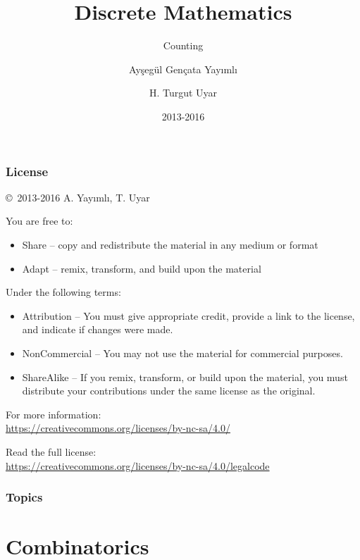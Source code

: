 \documentclass[dvipsnames]{beamer}
\title{Discrete Mathematics}
\subtitle{Counting}
\author{Ayşegül Gençata Yayımlı \and H. Turgut Uyar}
\date{2013-2016}
\begin{document}
\begin{frame}
  \titlepage
\end{frame}

\begin{frame}
  \frametitle{License}

  \hfill
  \copyright~2013-2016 A. Yayımlı, T. Uyar

  \vfill
  \begin{footnotesize}
    You are free to:
    \begin{itemize}
      \itemsep0em
      \item Share -- copy and redistribute the material in any medium or format
      \item Adapt -- remix, transform, and build upon the material
    \end{itemize}

    Under the following terms:
    \begin{itemize}
      \itemsep0em
      \item Attribution -- You must give appropriate credit, provide a link to
        the license, and indicate if changes were made.

      \item NonCommercial -- You may not use the material for commercial
        purposes.

      \item ShareAlike -- If you remix, transform, or build upon the material,
        you must distribute your contributions under the same license as the
        original.
    \end{itemize}
  \end{footnotesize}

  \begin{small}
    For more information:\\
    \url{https://creativecommons.org/licenses/by-nc-sa/4.0/}

    \smallskip
    Read the full license:\\
    \url{https://creativecommons.org/licenses/by-nc-sa/4.0/legalcode}
  \end{small}
\end{frame}

\begin{frame}
  \frametitle{Topics}
  \tableofcontents
\end{frame}

\section{Combinatorics}
\end{document}
